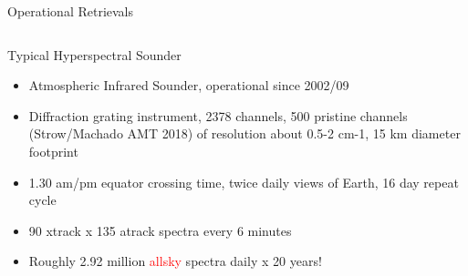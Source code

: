 \documentclass[10pt,t]{beamer}
\begin{document}

\begin{frame}[shrink=2]{Operational Retrievals}
\vspace{-0.11in}
\begin{columns}

\begin{column}{0.55\columnwidth}
\begin{block}{Typical Hyperspectral Sounder}
  \begin{itemize}
  \item Atmospheric Infrared Sounder, operational since 2002/09
  \item Diffraction grating instrument, 2378 channels, 500 pristine channels 
        (Strow/Machado AMT 2018) of resolution about 0.5-2 cm-1, 15 km diameter footprint
  \item 1.30 am/pm equator crossing time, twice daily views of Earth, 16 day repeat cycle
  \item 90 xtrack x 135 atrack spectra every 6 minutes
  \item Roughly 2.92 million \textcolor{red}{allsky} spectra daily x 20 years!
  \end{itemize}
\end{block}
\end{column}


\end{columns}
\end{frame}
\end{document}
